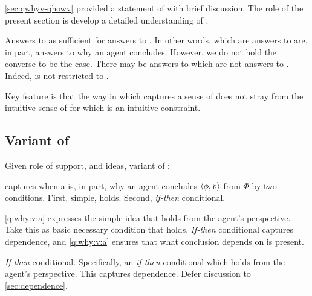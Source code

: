 \begin{note}[Introduction]
  \autoref{sec:qwhyv-qhowv} provided a statement of \qWhyV{} with brief discussion.
  The role of the present section is develop a detailed understanding of \qWhyV{}.


  Answers to \qWhyV{} as sufficient for answers to \qWhy{}.
  In other words,  which are answers to \qWhyV{} are, in part, answers to why an agent concludes.
  However, we do not hold the converse to be the case.
  There may be answers to \qWhy{} which are not answers to \qWhyV{}.
  Indeed, \qWhy{} is not restricted to .

  Key feature is that the way in which \qWhyV{} captures a sense of \qWhy{} does not stray from the intuitive sense of \qWhy{} for which \issueInclusion{} is an intuitive constraint.
\end{note}

\subsection{Variant of \qWhy{}}
\label{cha:clar:expand:qWhy:variant}

\begin{note}
  Given role of support, and ideas, variant of \qWhy{}:

  \questionWhyV*

  \qWhyV{} captures when a \ros{} is, in part, why an agent concludes \(\langle \phi, v \rangle\) from \(\Phi\) by two conditions.
  First, simple, \ros{} holds.
  Second, \emph{if-then} conditional.

  \ref{q:why:v:a} expresses the simple idea that \support{} holds from the agent's perspective.
  Take this as basic necessary condition that \support{} holds.
  \emph{If-then} conditional captures dependence, and \ref{q:why:v:a} ensures that what conclusion depends on is present.

  \emph{If-then} conditional.
  Specifically, an \emph{if-then} conditional which holds from the agent's perspective.
  This captures dependence.
  Defer discussion to \autoref{sec:dependence}.
\end{note}

